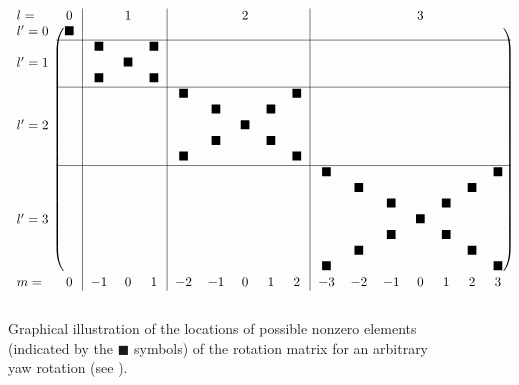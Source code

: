 \begin{figure}[h]
\[
    \begin{blockarray}{lc|ccc|ccccc|ccccccc}
    l= & 0 & & 1 & & & & 2 & & & & & & 3 & & & \\
    \begin{block}{l(c|ccc|ccccc|ccccccc)}
     l' = 0 & \blacksquare &  &  &  &  &  &  &  &  &  &  &  &  &  &  &  \\ \cline{2-17}
     &  & \blacksquare &  & \blacksquare &  &  &  &  &  &  &  &  &  &  &  &  \\
     l' = 1 &  &  & \blacksquare &  &  &  &  &  &  &  &  &  &  &  &  &  \\
     &  & \blacksquare &  & \blacksquare &  &  &  &  &  &  &  &  &  &  &  &  \\ \cline{2-17}
     &  &  &  &  & \blacksquare &  &  &  & \blacksquare &  &  &  &  &  &  &  \\
     &  &  &  &  &  & \blacksquare &  & \blacksquare &  &  &  &  &  &  &  &  \\
     l' = 2 &  &  &  &  &  &  & \blacksquare &  &  &  &  &  &  &  &  &  \\
     &  &  &  &  &  & \blacksquare &  & \blacksquare &  &  &  &  &  &  &  &  \\
     &  &  &  &  & \blacksquare &  &  &  & \blacksquare &  &  &  &  &  &  &  \\ \cline{2-17}
     &  &  &  &  &  &  &  &  &  & \blacksquare &  &  &  &  &  & \blacksquare \\
     &  &  &  &  &  &  &  &  &  &  & \blacksquare &  &  &  & \blacksquare &  \\
     &  &  &  &  &  &  &  &  &  &  &  & \blacksquare &  & \blacksquare &  &  \\
     l' = 3 &  &  &  &  &  &  &  &  &  &  &  &  & \blacksquare &  &  &  \\
     &  &  &  &  &  &  &  &  &  &  &  & \blacksquare &  & \blacksquare &  &  \\
     &  &  &  &  &  &  &  &  &  &  & \blacksquare &  &  &  & \blacksquare &  \\
     &  &  &  &  &  &  &  &  &  & \blacksquare &  &  &  &  &  & \blacksquare \\
    \end{block}
    m= & 0 & -1 & 0 & 1 & -2 & -1 & 0 & 1 & 2 & -3 & -2 & -1 & 0 & 1 & 2 & 3 \\
    \end{blockarray}
\]
\caption[Graphical illustration of the rotation matrix for an arbitrary yaw rotation.]{
Graphical illustration of the locations of possible nonzero elements (indicated by the $\blacksquare$ symbols) of the rotation matrix for an arbitrary yaw rotation (see ).}
\label{fig:A1_Navigation_Filters:Variable_Yaw}
\end{figure}

